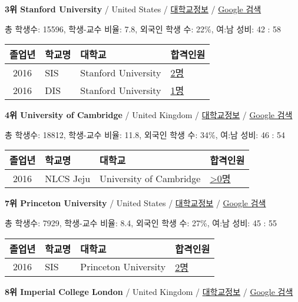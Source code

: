 \documentclass[13pt,]{article}
\begin{document}
\textbf{3위 Stanford University} / United States /
\href{https://www.timeshighereducation.com/world-university-rankings/stanford-university?ranking-dataset=589595}{대학교정보}
/ \href{http://www.google.com/search?q=Stanford+University}{Google 검색}

총 학생수: 15596, 학생-교수 비율: 7.8, 외국인 학생 수: 22\%, 여:남 성비:
42 : 58

\begin{longtable}[]{@{}clll@{}}
\toprule
졸업년 & 학교명 & 대학교 & 합격인원\tabularnewline
\midrule
\endhead
2016 & SIS & Stanford University &
\href{http://cafe.naver.com/assarabia/11589}{2명}\tabularnewline
2016 & DIS & Stanford University &
\href{http://cafe.naver.com/assarabia/11591}{1명}\tabularnewline
\bottomrule
\end{longtable}

\textbf{4위 University of Cambridge} / United Kingdom /
\href{https://www.timeshighereducation.com/world-university-rankings/university-of-cambridge?ranking-dataset=589595}{대학교정보}
/ \href{http://www.google.com/search?q=University+of+Cambridge}{Google
검색}

총 학생수: 18812, 학생-교수 비율: 11.8, 외국인 학생 수: 34\%, 여:남
성비: 46 : 54

\begin{longtable}[]{@{}clll@{}}
\toprule
졸업년 & 학교명 & 대학교 & 합격인원\tabularnewline
\midrule
\endhead
2016 & NLCS Jeju & University of Cambridge &
\href{http://cafe.naver.com/assarabia/11592}{\textgreater{}0명}\tabularnewline
\bottomrule
\end{longtable}

\textbf{7위 Princeton University} / United States /
\href{https://www.timeshighereducation.com/world-university-rankings/princeton-university?ranking-dataset=589595}{대학교정보}
/ \href{http://www.google.com/search?q=Princeton+University}{Google
검색}

총 학생수: 7929, 학생-교수 비율: 8.4, 외국인 학생 수: 27\%, 여:남 성비:
45 : 55

\begin{longtable}[]{@{}clll@{}}
\toprule
졸업년 & 학교명 & 대학교 & 합격인원\tabularnewline
\midrule
\endhead
2016 & SIS & Princeton University &
\href{http://cafe.naver.com/assarabia/11589}{2명}\tabularnewline
\bottomrule
\end{longtable}

\textbf{8위 Imperial College London} / United Kingdom /
\href{https://www.timeshighereducation.com/world-university-rankings/imperial-college-london?ranking-dataset=589595}{대학교정보}
/ \href{http://www.google.com/search?q=Imperial+College+London}{Google
검색}
\end{document}
